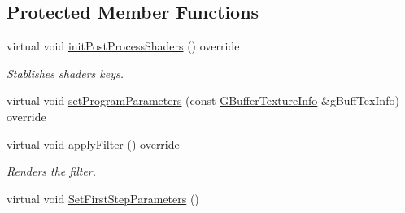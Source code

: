 \subsection*{Protected Member Functions}
\begin{DoxyCompactItemize}
\item 
\mbox{\label{class_geometry_engine_1_1_geometry_post_process_1_1_double_pass_post_process_1_1_blur_post_process_a12fac4df2ff487e6696c08641008a3a0}} 
virtual void \mbox{\hyperlink{class_geometry_engine_1_1_geometry_post_process_1_1_double_pass_post_process_1_1_blur_post_process_a12fac4df2ff487e6696c08641008a3a0}{init\+Post\+Process\+Shaders}} () override
\begin{DoxyCompactList}\small\item\em Stablishes shaders keys. \end{DoxyCompactList}\item 
virtual void \mbox{\hyperlink{class_geometry_engine_1_1_geometry_post_process_1_1_double_pass_post_process_1_1_blur_post_process_a280fb0972fb63b1d0f283604678a7404}{set\+Program\+Parameters}} (const \mbox{\hyperlink{class_geometry_engine_1_1_g_buffer_texture_info}{G\+Buffer\+Texture\+Info}} \&g\+Buff\+Tex\+Info) override
\item 
\mbox{\label{class_geometry_engine_1_1_geometry_post_process_1_1_double_pass_post_process_1_1_blur_post_process_a7d5a7ae52ec45c080b136c9afd13fc3c}} 
virtual void \mbox{\hyperlink{class_geometry_engine_1_1_geometry_post_process_1_1_double_pass_post_process_1_1_blur_post_process_a7d5a7ae52ec45c080b136c9afd13fc3c}{apply\+Filter}} () override
\begin{DoxyCompactList}\small\item\em Renders the filter. \end{DoxyCompactList}\item 
\mbox{\label{class_geometry_engine_1_1_geometry_post_process_1_1_double_pass_post_process_1_1_blur_post_process_a49cf9fb1a732737842373c50155d2a92}} 
virtual void \mbox{\hyperlink{class_geometry_engine_1_1_geometry_post_process_1_1_double_pass_post_process_1_1_blur_post_process_a49cf9fb1a732737842373c50155d2a92}{Set\+First\+Step\+Parameters}} ()

\end{DoxyCompactItemize}
